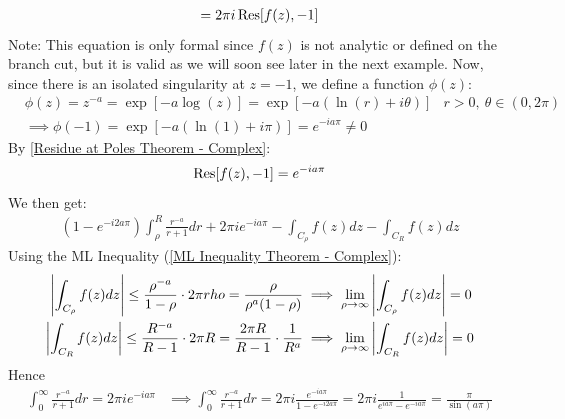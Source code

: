 \documentclass[12pt, english]{book}
\makeatletter
\renewenvironment{proof}[1][\proofname]{\par
	\pushQED{\qed}%
	\normalfont \topsep6\p@\@plus6\p@\relax
	\list{}{%
		\settowidth{\leftmargin}{\itshape\proofname:\hskip\labelsep}%
		\setlength{\labelwidth}{0pt}%
		\setlength{\itemindent}{-\leftmargin}%
	}%
	\item[\hskip\labelsep\itshape#1\@addpunct{:}]\ignorespaces
	}{ \popQED\endlist\@endpefalse}
\makeatother
\begin{document}
\begin{example}
\begin{proof}
\begin{align*}
				= 2\pi i \Res[f(z), -1]
			\end{align*}
			Note: This equation is only formal since \(f(z)\) is not analytic or defined on the branch cut, but it is valid as we will soon see later in the next example.
			Now, since there is an isolated singularity at \(z=-1\), we define a function \(\phi(z)\):
			\begin{align*}
				&\phi(z) = z^{-a} = \exp[-a\log(z)] = \exp[-a(\ln(r) + i \theta)]
					& r>0, \ \theta \in (0, 2\pi) \\
				&\implies \phi(-1) = \exp[-a(\ln(1) + i\pi)] = e^{-ia\pi} \neq 0
			\end{align*}
			By \cref{Residue at Poles Theorem - Complex}:
			\begin{align*}
				\Res[f(z), -1] = e^{-ia\pi}
			\end{align*}
			We then get:
			\begin{align*}
				(1-e^{-i2a\pi}) \int_{\rho}^{R} \frac{r^{-a}}{r+1} dr + 2\pi i e^{-ia\pi}
					- \int_{C_\rho} f(z) dz - \int_{C_R} f(z) dz
			\end{align*}
		 	Using the ML Inequality (\cref{ML Inequality Theorem - Complex}):
		 	\begin{align*}
		 		\abs{\int_{C_\rho} f(z) dz} 
		 		\leq \frac{\rho^{-a}}{1-\rho} \cdot 2\pi rho = \frac{\rho}{\rho^a(1-\rho)}
		 		&\implies \lim_{\rho \rightarrow \infty} \abs{\int_{C_\rho} f(z) dz}  = 0 \\
		 		\abs{\int_{C_R} f(z) dz} 
		 		\leq \frac{R^{-a}}{R-1} \cdot 2\pi R = \frac{2\pi R}{R-1} \cdot \frac{1}{R^a}
		 		&\implies \lim_{\rho \rightarrow \infty} \abs{\int_{C_R} f(z) dz}  = 0 
		 	\end{align*}
	 		Hence
	 		\begin{align*}
	 			\int_{0}^{\infty} \frac{r^{-a}}{r+1} dr = 2\pi i e^{-ia\pi}
	 			&\implies \int_{0}^{\infty} \frac{r^{-a}}{r+1} dr 
	 				= 2\pi i \frac{e^{-ia\pi}}{1-e^{-i2a\pi}} 
	 				= 2\pi i \frac{1}{e^{ia\pi} - e^{-ia\pi}}
	 				= \frac{\pi}{\sin(a\pi)}
	 		\end{align*}
		\end{proof}
	\end{example}
\end{document}
